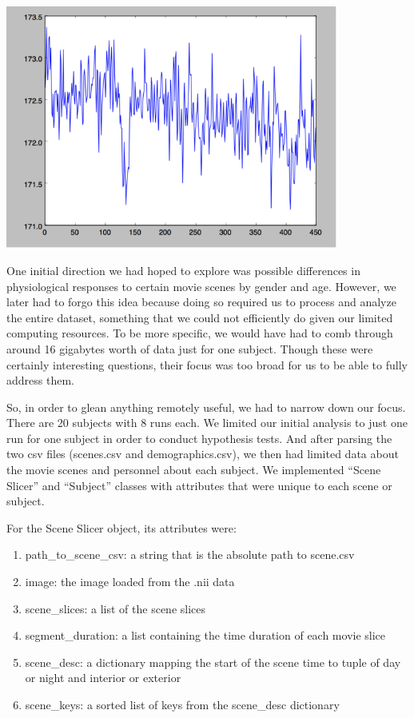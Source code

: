 \documentclass[11pt]{article}
\begin{document}
\begin{center}
\includegraphics[height=8cm]{8}
\end{center}

One initial direction we had hoped to explore was possible differences in
physiological responses to certain movie scenes by gender and age. However, we
later had to forgo this idea because doing so required us to process and
analyze the entire dataset, something that we could not efficiently do given
our limited computing resources. To be more specific, we would have had to
comb through around 16 gigabytes worth of data just for one subject. Though
these were certainly interesting questions, their focus was too broad for us
to be able to fully address them.

So, in order to glean anything remotely useful, we had to narrow down our
focus. There are 20 subjects with 8 runs each. We limited our initial analysis
to just one run for one subject in order to conduct hypothesis tests. And
after parsing the two csv files (scenes.csv and demographics.csv), we then had
limited data about the movie scenes and personnel about each subject. We
implemented “Scene Slicer” and “Subject” classes with attributes that were
unique to each scene or subject.

For the Scene Slicer object, its attributes were:
\begin{enumerate}
\item path\_to\_scene\_csv: a string that is the absolute path to scene.csv
\item image: the image loaded from the .nii data
\item scene\_slices: a list of the scene slices
\item segment\_duration: a list containing the time duration of each movie
slice
\item scene\_desc: a dictionary mapping the start of the scene time to tuple
of day or night and interior or exterior
\item scene\_keys: a sorted list of keys from the scene\_desc dictionary
\end{enumerate}
\end{document}
